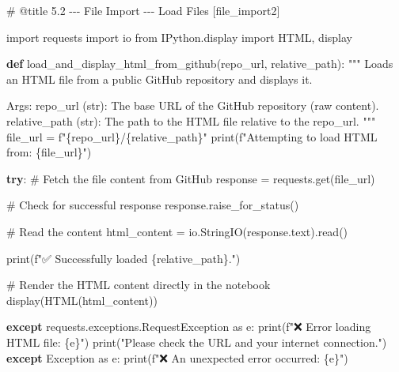 \documentclass[
  11pt,
  letterpaper,
]{book}
\newenvironment{Shaded}{\begin{snugshade}}{\end{snugshade}}
\newcommand{\BuiltInTok}[1]{\textcolor[rgb]{0.00,0.23,0.31}{#1}}
\newcommand{\CommentTok}[1]{\textcolor[rgb]{0.37,0.37,0.37}{#1}}
\newcommand{\ControlFlowTok}[1]{\textcolor[rgb]{0.00,0.23,0.31}{\textbf{#1}}}
\newcommand{\ImportTok}[1]{\textcolor[rgb]{0.00,0.46,0.62}{#1}}
\newcommand{\KeywordTok}[1]{\textcolor[rgb]{0.00,0.23,0.31}{\textbf{#1}}}
\newcommand{\NormalTok}[1]{\textcolor[rgb]{0.00,0.23,0.31}{#1}}
\newcommand{\OperatorTok}[1]{\textcolor[rgb]{0.37,0.37,0.37}{#1}}
\newcommand{\PreprocessorTok}[1]{\textcolor[rgb]{0.68,0.00,0.00}{#1}}
\newcommand{\SpecialCharTok}[1]{\textcolor[rgb]{0.37,0.37,0.37}{#1}}
\newcommand{\SpecialStringTok}[1]{\textcolor[rgb]{0.13,0.47,0.30}{#1}}
\newcommand{\StringTok}[1]{\textcolor[rgb]{0.13,0.47,0.30}{#1}}
\begin{document}
\begin{Shaded}
\begin{Highlighting}[]
\CommentTok{\# @title 5.2 {-}{-}{-} File Import {-}{-}{-} Load Files [file\_import2]}

\ImportTok{import}\NormalTok{ requests}
\ImportTok{import}\NormalTok{ io}
\ImportTok{from}\NormalTok{ IPython.display }\ImportTok{import}\NormalTok{ HTML, display}

\KeywordTok{def}\NormalTok{ load\_and\_display\_html\_from\_github(repo\_url, relative\_path):}
    \CommentTok{"""}
\CommentTok{    Loads an HTML file from a public GitHub repository and displays it.}

\CommentTok{    Args:}
\CommentTok{        repo\_url (str): The base URL of the GitHub repository (raw content).}
\CommentTok{        relative\_path (str): The path to the HTML file relative to the repo\_url.}
\CommentTok{    """}
\NormalTok{    file\_url }\OperatorTok{=} \SpecialStringTok{f"}\SpecialCharTok{\{}\NormalTok{repo\_url}\SpecialCharTok{\}}\SpecialStringTok{/}\SpecialCharTok{\{}\NormalTok{relative\_path}\SpecialCharTok{\}}\SpecialStringTok{"}
    \BuiltInTok{print}\NormalTok{(}\SpecialStringTok{f"Attempting to load HTML from: }\SpecialCharTok{\{}\NormalTok{file\_url}\SpecialCharTok{\}}\SpecialStringTok{"}\NormalTok{)}

    \ControlFlowTok{try}\NormalTok{:}
        \CommentTok{\# Fetch the file content from GitHub}
\NormalTok{        response }\OperatorTok{=}\NormalTok{ requests.get(file\_url)}

        \CommentTok{\# Check for successful response}
\NormalTok{        response.raise\_for\_status()}

        \CommentTok{\# Read the content}
\NormalTok{        html\_content }\OperatorTok{=}\NormalTok{ io.StringIO(response.text).read()}

        \BuiltInTok{print}\NormalTok{(}\SpecialStringTok{f"✅ Successfully loaded }\SpecialCharTok{\{}\NormalTok{relative\_path}\SpecialCharTok{\}}\SpecialStringTok{."}\NormalTok{)}

        \CommentTok{\# Render the HTML content directly in the notebook}
\NormalTok{        display(HTML(html\_content))}

    \ControlFlowTok{except}\NormalTok{ requests.exceptions.RequestException }\ImportTok{as}\NormalTok{ e:}
        \BuiltInTok{print}\NormalTok{(}\SpecialStringTok{f"❌ Error loading HTML file: }\SpecialCharTok{\{}\NormalTok{e}\SpecialCharTok{\}}\SpecialStringTok{"}\NormalTok{)}
        \BuiltInTok{print}\NormalTok{(}\StringTok{"Please check the URL and your internet connection."}\NormalTok{)}
    \ControlFlowTok{except} \PreprocessorTok{Exception} \ImportTok{as}\NormalTok{ e:}
        \BuiltInTok{print}\NormalTok{(}\SpecialStringTok{f"❌ An unexpected error occurred: }\SpecialCharTok{\{}\NormalTok{e}\SpecialCharTok{\}}\SpecialStringTok{"}\NormalTok{)}


\end{Highlighting}
\end{Shaded}
\end{document}
